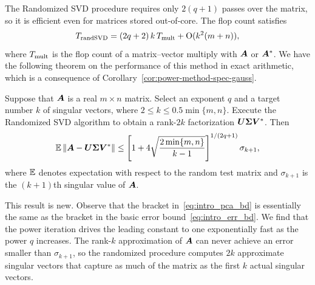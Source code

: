 \documentclass[final]{siamltex}
\newcounter{algorithm}[section]
\newcommand{\pgnotate}[1]{{\color{blue}[#1]}}
\begin{document}
The Randomized SVD procedure requires %
only $2(q+1)$ passes over the matrix, so it is
efficient even for matrices stored out-of-core.
The flop count satisfies
$$
T_{\rm rand SVD} = (2q+2)\,k \, T_{\rm mult} + \mathrm{O}(k^2 (m + n)),
$$
where $T_{\rm mult}$ is the flop count of a matrix--vector multiply
with $\bm{A}$ or $\bm{A}^*$.
We have the following theorem on the performance of this method
in exact arithmetic, which is a consequence of
Corollary~\ref{cor:power-method-spec-gauss}.


\lsp

\begin{theorem}
Suppose that $\bm{A}$ is a real $m \times n$ matrix.  Select
an exponent $q$ and a target number $k$ of singular vectors,
where $2 \leq k \leq 0.5 \min\{m,n\}$.
Execute the Randomized SVD algorithm to obtain a rank-$2k$
factorization $\bm{U\Sigma V}^*$.  Then
\begin{equation}
\label{eq:intro_pca_bd}
\Expect \norm{ \mtx{A} - \mtx{U\Sigma V}^\adj }
    \leq \left[ 1 + 4 \sqrt{\frac{2\min\{m,n\}}{k-1}} \right]^{1/(2q+1)} \sigma_{k+1},
\end{equation}
where $\operatorname{\mathbb{E}}$ denotes expectation with respect to the
random test matrix and $\sigma_{k+1}$ is the $(k+1)$th
singular value of $\bm{A}$.
\end{theorem}

\lsp

This result is new.
Observe that the bracket in~\eqref{eq:intro_pca_bd} is essentially
the same as the bracket in the basic error bound~\eqref{eq:intro_err_bd}.
We find that the power iteration drives the leading constant to one
exponentially fast as the power $q$ increases.
The rank-$k$ approximation of $\bm{A}$ can never achieve an error
smaller than $\sigma_{k+1}$, so the randomized procedure computes $2k$
approximate singular vectors that capture as much of the matrix
as the first $k$ actual singular vectors.
\end{document}
